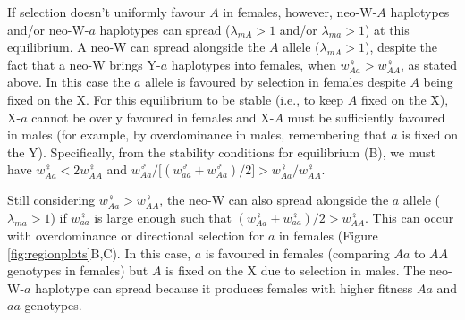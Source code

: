 \documentclass[12pt]{article}
\begin{document}
If selection doesn't uniformly favour $A$ in females, however, neo-W-$A$ haplotypes and/or neo-W-$a$ haplotypes can spread ($\lambda_{mA}>1$ and/or $\lambda_{ma}>1$) at this equilibrium.
A neo-W can spread alongside the $A$ allele ($\lambda_{mA}>1$), despite the fact that a neo-W brings Y-$a$ haplotypes into females, when $w_{Aa}^\female>w_{AA}^\female$, as stated above.
In this case the $a$ allele is favoured by selection in females despite $A$ being fixed on the X.
For this equilibrium to be stable (i.e.,  to keep $A$ fixed on the X), X-$a$ cannot be overly favoured in females and X-$A$ must be sufficiently favoured in males (for example, by overdominance in males, remembering that $a$ is fixed on the Y). 
Specifically, from the stability conditions for equilibrium (B), we must have $w_{Aa}^\female < 2 w_{AA}^\female$ and $w_{Aa}^\male/\big[(w_{aa}^\male+w_{Aa}^\male)/2\big]>w_{Aa}^\female/w_{AA}^\female$.

Still considering $w_{Aa}^\female>w_{AA}^\female$, the neo-W can also spread alongside the $a$ allele ($\lambda_{ma}>1$) if $w_{aa}^\female$ is large enough such that $(w_{Aa}^\female+w_{aa}^\female)/2>w_{AA}^\female$.
This can occur with overdominance or directional selection for $a$ in females (Figure \ref{fig:regionplots}B,C).
In this case, $a$ is favoured in females (comparing $Aa$ to $AA$ genotypes in females) but $A$ is fixed on the X due to selection in males. 
The neo-W-$a$ haplotype can spread because it produces females with higher fitness $Aa$ and $aa$ genotypes. 

\end{document}
